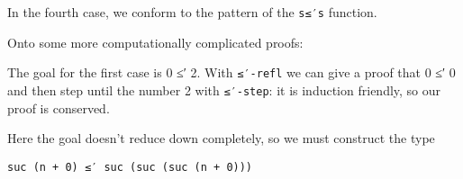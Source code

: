 {In the fourth case, we conform to the pattern of the \texttt{s≤′s} function.

\begin{code}  %
\>[0]\AgdaSpace{}%
\AgdaSymbol{(}\AgdaSpace{}%
\AgdaSymbol{)}\AgdaSpace{}%
\AgdaSymbol{(}\AgdaSpace{}%
\AgdaSymbol{)}\AgdaSpace{}%
\AgdaSymbol{=}\AgdaSpace{}%
\AgdaSpace{}%
\AgdaSymbol{(}\AgdaSpace{}%
\AgdaSymbol{(}\AgdaSpace{}%
\AgdaSymbol{)}\AgdaSpace{}%
\AgdaSymbol{)}\<%
\end{code}

Onto some more computationally complicated proofs:

\begin{code}%
\>[0]\AgdaSpace{}%
\AgdaSymbol{:}\AgdaSpace{}%
\AgdaSpace{}%
\AgdaSpace{}%
\AgdaSpace{}%
\AgdaSpace{}%
\AgdaSpace{}%
\AgdaOperator{\AgdaPrimitive{+}}\AgdaSpace{}%
\AgdaSpace{}%
\AgdaSpace{}%
\AgdaSpace{}%
\AgdaSymbol{(}\AgdaSpace{}%
\AgdaSymbol{(}\AgdaSpace{}%
\AgdaOperator{\AgdaPrimitive{+}}\AgdaSpace{}%
\AgdaSymbol{)}\AgdaSpace{}%
\AgdaOperator{\AgdaPrimitive{+}}\AgdaSpace{}%
\AgdaSymbol{)}\<%
\end{code}

The goal for the first case is 0 ≤′ 2. With \texttt{≤′-refl} we can give a proof that 0 ≤′ 0 and then step until the number 2 with \texttt{≤′-step}: it is induction friendly, so our proof is conserved.

\begin{code}%
\>[0]\AgdaSpace{}%
\AgdaSpace{}%
\AgdaSpace{}%
\AgdaSymbol{=}\AgdaSpace{}%
\AgdaSpace{}%
\AgdaSymbol{(}\AgdaSpace{}%
\AgdaSymbol{)}\<%
\end{code}

Here the goal doesn't reduce down completely, so we must construct the type

\begin{center}
  \texttt{suc (n + 0) ≤′ suc (suc (suc (n + 0)))}
\end{center}

}
